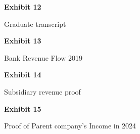 \documentclass{article}
\begin{document}
 

\vspace*{\fill}
\begin{center}

{\LARGE \bf
Exhibit 12
}

\vspace{10\baselineskip}

{\large Graduate transcript}

\end{center}
\vspace*{\fill}


 



\vspace*{\fill}
\begin{center}

{\LARGE \bf
Exhibit 13
}

\vspace{10\baselineskip}

{\large  Bank Revenue Flow 2019}

\end{center}
\vspace*{\fill}


% 

% 




\vspace*{\fill}
\begin{center}

{\LARGE \bf
Exhibit 14
}

\vspace{10\baselineskip}

{\large Subsidiary revenue proof}

\end{center}
\vspace*{\fill}

% 


\vspace*{\fill}
\begin{center}

{\LARGE \bf
Exhibit 15
}

\vspace{10\baselineskip}

{\large Proof of Parent company's Income in 2024}

\end{center}
\vspace*{\fill}
\end{document}

